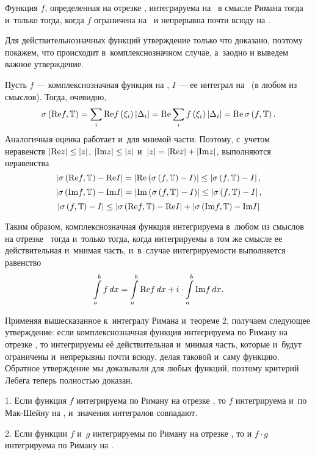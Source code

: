 \documentclass[draft]{article}
\begin{document}
\prtm

\bigskip


Функция $f$, определенная на отрезке \ab, интегрируема на \ab\ в
смысле Римана тогда и~только тогда, когда $f$ ограничена на \ab\ и
непрерывна почти всюду на \ab.

\pr

Для действительнозначных функций утверждение только что доказано,
поэтому покажем, что происходит в~комплекснозначном случае, а~заодно
и выведем важное утверждение.

\smallskip

Пусть $f$ --- комплекснозначная функция на \ab, $I$ --- ее интеграл
на \ab\ (в любом из смыслов). Тогда, очевидно, $$\isum(\re
f,\T)=\sumi\re\fxildi=\re\sumi\fxildi=\re\,\isfT.$$ Аналогичная
оценка работает и~для мнимой части. Поэтому, с~учетом неравенств
$\left|\mathrm{Re} z\right|\le\left|z\right|$, $\left|\mathrm{Im} z\right|\le\left|z\right|$ и~$\left|z\right|=\left|\mathrm{Re}
z\right|+\left|\mathrm{Im} z\right|$, выполняются неравенства
$$\abs{\isum(\re f,\T)-\re
I}=\abs{\re\at(\isfT-I)}\le\abs{\isfT-I},$$
$$\abs{\isum(\im f,\T)-\im
I}=\abs{\im\at(\isfT-I)}\le\abs{\isfT-I},$$
$$\abs{\isfT-I}\le\abs{\isum(\re f,\T)-\re
I}+\abs{\isum(\im f,\T)-\im I}$$

\eject

Таким образом, комплекснозначная функция интегрируема в~любом из
смыслов на отрезке \ab\ тогда и~только тогда, когда интегрируемы в
том же смысле ее действительная и~мнимая часть, и~в~случае
интегрируемости выполняется равенство
$$\intabfdx=\intab{\re f},x+i\cdot \intab{\im f},x.$$

Применяя вышесказанное к~интегралу Римана и~теореме $2$, получаем
следующее утверждение: если комплекснозначная функция интегрируема
по Риману на отрезке \ab, то интегрируемы её действительная и~мнимая
часть, которые и~будут ограничены и~непрерывны почти всюду, делая
таковой и~саму функцию. Обратное утверждение мы доказывали для любых
функций, поэтому критерий Лебега теперь полностью доказан.

\primp

\bigskip

\imps

\smallskip

1. Если функция $f$ интегрируема по Риману на отрезке \ab, то $f$
интегрируема и~по Мак-Шейну на \ab, и~значения интегралов совпадают.

\smallskip

2. Если функции $f$ и~$g$ интегрируемы по Риману на отрезке \ab, то
и $f  \cdot g$ интегрируема по Риману на \ab.
\end{document}

